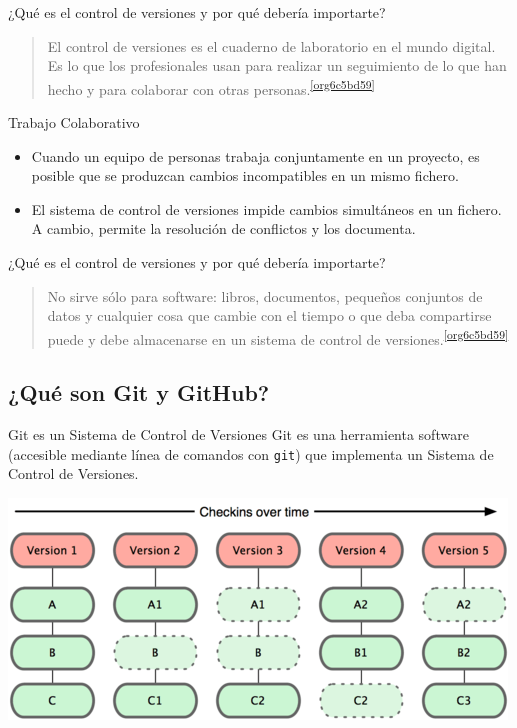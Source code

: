\documentclass[xcolor={usenames,svgnames,dvipsnames}]{beamer}
\begin{document}
\begin{frame}[label={sec:orgbe2363c}]{¿Qué es el control de versiones y por qué debería importarte?}
\begin{quote}
El control de versiones es el \alert{cuaderno de laboratorio} en el mundo digital. Es lo que los profesionales usan para realizar un
\alert{seguimiento} de lo que han hecho y para \alert{colaborar} con otras
personas.\textsuperscript{\ref{org6c5bd59}}
\end{quote}

\begin{block}{Trabajo Colaborativo}
\begin{itemize}
\item Cuando un equipo de personas trabaja conjuntamente en un proyecto, es posible que se produzcan cambios incompatibles en un mismo fichero.
\item El sistema de control de versiones \alert{impide} cambios simultáneos en un fichero. A cambio, permite la \alert{resolución de conflictos} y los documenta.
\end{itemize}
\end{block}
\end{frame}

\begin{frame}[label={sec:org0f8c017}]{¿Qué es el control de versiones y por qué debería importarte?}
\begin{quote}
\alert{No sirve sólo para software}: libros, documentos, pequeños conjuntos
de datos y cualquier cosa que cambie con el tiempo o que deba
compartirse puede y debe almacenarse en un sistema de control de
versiones.\textsuperscript{\ref{org6c5bd59}}
\end{quote}
\end{frame}

\subsection{¿Qué son Git y GitHub?}
\label{sec:orgada061b}

\begin{frame}[label={sec:orge529258},fragile]{Git es un Sistema de Control de Versiones}
 Git es una herramienta software (accesible mediante línea de comandos con \texttt{git}) que implementa un Sistema de Control de Versiones.

\begin{center}
\includegraphics[width=.9\linewidth]{figs/git_model.png}
\end{center}
\end{frame}
\end{document}
